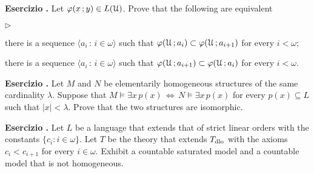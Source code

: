\documentclass[10pt]{article}
\def\phi{\varphi}
\def\U{\EuScript U}
\def\<{\langle}
\def\>{\rangle}
\def\E{\exists}
\def\IFF{\Leftrightarrow}
\newcommand{\labella}[1]{{\sf\footnotesize #1}\hfill}
\renewenvironment{itemize}
  {\begin{list}{$\triangleright$}{%
   \setlength{\parskip}{0mm}
   \setlength{\topsep}{0mm}
   \setlength{\rightmargin}{0mm}
   \setlength{\listparindent}{0mm}
   \setlength{\itemindent}{0mm}
   \setlength{\labelwidth}{3ex}
   \setlength{\itemsep}{0mm}
   \setlength{\parsep}{0mm}
   \setlength{\partopsep}{0mm}
   \setlength{\labelsep}{1ex}
   \setlength{\leftmargin}{\labelwidth+\labelsep}
   \let\makelabel\labella}}{%
   \end{list}}
\newcounter{ex}
\newenvironment{exercise}{\clearpage\addtocounter{ex}{1}\textbf{Esercizio \theex.\quad}}{}
\begin{document}
\clearpage%
\rhead{}

\begin{exercise} 
Let $\phi(x\,;y)\in L(\U)$. Prove that the following are equivalent
\begin{itemize}
\item[1.] there is a sequence $\<a_i\,:\,i\in\omega\>$ such that $\phi(\U\,;a_i)\subset\phi(\U\,;a_{i+1})$ for every $i<\omega$;
\item[2.] there is a sequence $\<a_i\,:\,i\in\omega\>$ such that $\phi(\U\,;a_{i+1})\subset\phi(\U\,;a_i)$ for every $i<\omega$.
\end{itemize}
\end{exercise}


\begin{exercise}
Let $M$ and $N$ be elementarily homogeneous structures of the same cardinality $\lambda$. Suppose that $M\models\E x\, p(x)\,\IFF\,N\models\E x\, p(x)$ for every $p(x)\subseteq L$ such that $|x|<\lambda$. Prove that the two structures are isomorphic.
\end{exercise}


\begin{exercise}\label{vaughtesempio}
Let $L$ be a language that extends that of strict linear orders with the constants $\{c_i: i\in\omega\}$. Let $T$ be the theory that extends $T_{\rm dlo}$ with the axioms $c_i<c_{i+1}$ for every  $i\in\omega$. Exhibit a countable saturated model and a countable model that is not homogeneous.
\end{exercise}
\end{document}

